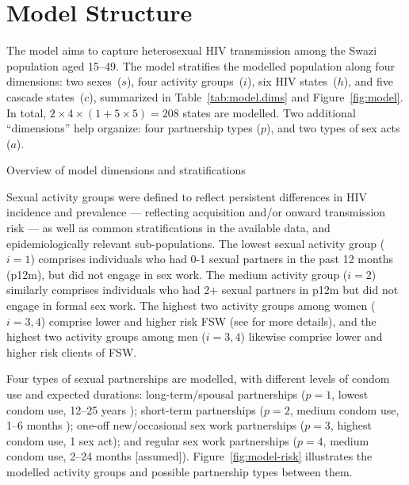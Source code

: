 \section{Model Structure}\label{model.str}
The model aims to capture heterosexual HIV transmission among the Swazi population aged 15--49.
The model stratifies the modelled population along four dimensions:
two sexes~($s$), four activity groups~($i$), six HIV states~($h$), and five cascade states~($c$),
summarized in Table~\ref{tab:model.dims} and Figure~\ref{fig:model}.
In total, $2 \times 4 \times (1 + 5 \times 5) = 208$ states are modelled.
Two additional ``dimensions'' help organize:
four partnership types ($p$), and two types of sex acts ($a$).
\begin{table}
  \centering
  \caption{Overview of model dimensions and stratifications}
  \label{tab:model.dims}
  
\end{table}
\par
Sexual activity groups were defined to reflect
persistent differences in HIV incidence and prevalence
\cite{SDHS2006,Bicego2013,Justman2016,SHIMS2}
--- reflecting acquisition and/or onward transmission risk ---
as well as common stratifications in the available data,
and epidemiologically relevant sub-populations.
The lowest sexual activity group ($i=1$) comprises
individuals who had 0-1 sexual partners in the past 12 months (p12m),
but did not engage in sex work.
The medium activity group ($i=2$) similarly comprises
individuals who had 2+ sexual partners in p12m
but did not engage in formal sex work.
The highest two activity groups among women ($i=3,4$) comprise
lower and higher risk FSW (see  for more details), and
the highest two activity groups among men ($i=3,4$) likewise comprise
lower and higher risk clients of FSW.
\par
Four types of sexual partnerships are modelled,
with different levels of condom use and expected durations:
long-term/spousal partnerships ($p=1$, lowest condom use, 12--25 years \cite{??}); %
short-term partnerships ($p=2$, medium condom use, 1--6 months \cite{??}); %
one-off new/occasional sex work partnerships ($p=3$, highest condom use, 1 sex act);
and regular sex work partnerships ($p=4$, medium condom use, 2--24 months [assumed]).
Figure~\ref{fig:model-risk} illustrates
the modelled activity groups and possible partnership types between them.
